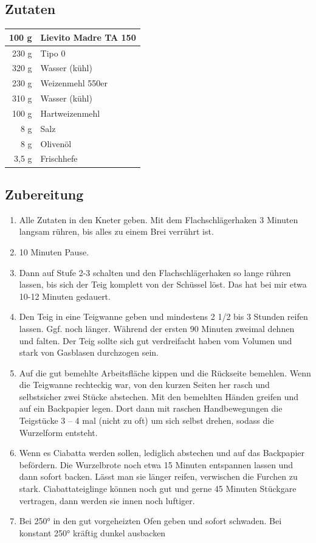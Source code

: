 \subsection*{Zutaten}

\begin{tabular}{r l}
    \toprule
    100 g & Lievito Madre TA 150 \\ \midrule
    230 g & Tipo 0               \\
    320 g & Wasser (kühl)        \\ \midrule
    230 g & Weizenmehl  550er    \\
    310 g & Wasser (kühl)        \\ \midrule
    100 g & Hartweizenmehl       \\
      8 g & Salz                 \\
      8 g & Olivenöl             \\
    3,5 g & Frischhefe           \\ \bottomrule
\end{tabular}

\subsection*{Zubereitung}
\begin{enumerate}
   \item Alle Zutaten in den Kneter geben. Mit dem Flachschlägerhaken  3 Minuten langsam rühren, bis alles zu einem Brei verrührt ist.
   \item 10 Minuten Pause.
   \item Dann auf Stufe 2-3 schalten und den Flachschlägerhaken so lange rühren lassen, bis sich der Teig komplett von der Schüssel löst. Das hat bei mir etwa 10-12 Minuten gedauert.
   \item Den Teig in eine Teigwanne geben und mindestens 2 1/2 bis 3 Stunden reifen lassen. Ggf. noch länger. Während der ersten 90 Minuten zweimal dehnen und falten. Der Teig sollte sich gut verdreifacht haben vom Volumen und stark von Gasblasen durchzogen sein.
   \item Auf die gut bemehlte Arbeitsfläche kippen und die Rückseite bemehlen. Wenn die Teigwanne rechteckig war, von den kurzen Seiten her rasch und selbstsicher zwei Stücke abstechen. Mit den bemehlten Händen greifen und auf ein Backpapier legen. Dort dann mit raschen Handbewegungen die Teigstücke 3 – 4 mal (nicht zu oft) um sich selbst drehen, sodass die Wurzelform entsteht.
   \item Wenn es Ciabatta werden sollen, lediglich abstechen und auf das Backpapier befördern. Die Wurzelbrote noch etwa 15 Minuten entspannen lassen und dann sofort backen. Lässt man sie länger reifen, verwischen die Furchen zu stark. Ciabattateiglinge können noch gut und gerne 45 Minuten Stückgare vertragen, dann werden sie innen noch luftiger.
   \item Bei 250° in den gut vorgeheizten Ofen geben und sofort schwaden. Bei konstant 250° kräftig dunkel ausbacken
\end{enumerate}
 
